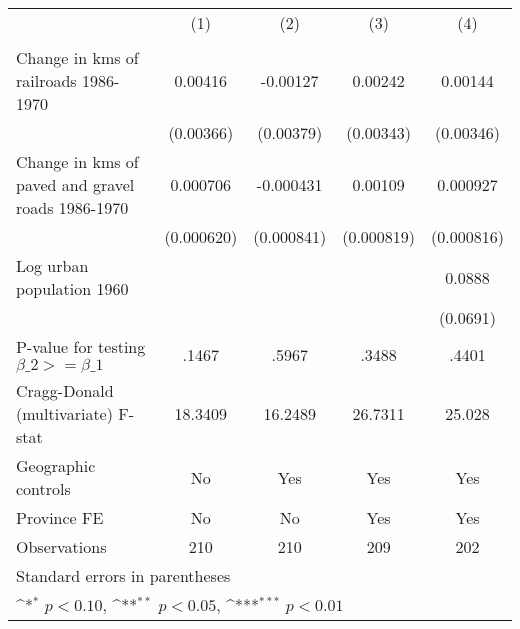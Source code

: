 {
\def\sym#1{\ifmmode^{#1}\else\(^{#1}\)\fi}
\begin{tabular}{l*{4}{c}}
\hline\hline
                &\multicolumn{1}{c}{(1)}&\multicolumn{1}{c}{(2)}&\multicolumn{1}{c}{(3)}&\multicolumn{1}{c}{(4)}\\
                &\multicolumn{1}{c}{}&\multicolumn{1}{c}{}&\multicolumn{1}{c}{}&\multicolumn{1}{c}{}\\
\hline
Change in kms of railroads 1986-1970&  0.00416         & -0.00127         &  0.00242         &  0.00144         \\
                &(0.00366)         &(0.00379)         &(0.00343)         &(0.00346)         \\
[1em]
Change in kms of paved and gravel roads 1986-1970& 0.000706         &-0.000431         &  0.00109         & 0.000927         \\
                &(0.000620)         &(0.000841)         &(0.000819)         &(0.000816)         \\
[1em]
Log urban population 1960&                  &                  &                  &   0.0888         \\
                &                  &                  &                  & (0.0691)         \\
\hline
P-value for testing $\beta\_{2} >= \beta\_{1}$&    .1467         &    .5967         &    .3488         &    .4401         \\
Cragg-Donald (multivariate) F-stat&  18.3409         &  16.2489         &  26.7311         &   25.028         \\
Geographic controls&       No         &      Yes         &      Yes         &      Yes         \\
Province FE     &       No         &       No         &      Yes         &      Yes         \\
Observations    &      210         &      210         &      209         &      202         \\
\hline\hline
\multicolumn{5}{l}{\footnotesize Standard errors in parentheses}\\
\multicolumn{5}{l}{\footnotesize \sym{*} \(p<0.10\), \sym{**} \(p<0.05\), \sym{***} \(p<0.01\)}\\
\end{tabular}
}
